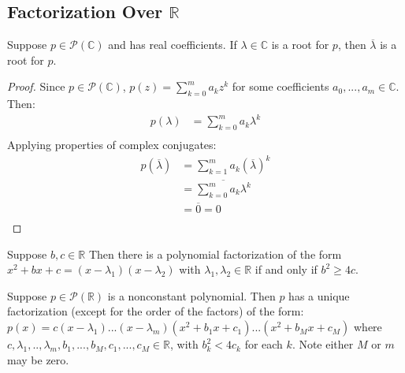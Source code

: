 \documentclass{article}
\begin{document}
\subsection{Factorization Over $\mathbb{R}$}

\begin{theorem}
  \label{thm:polynomial-with-reall-coefficients-have-complex-conjugate-zeros}
  Suppose $p \in \mathcal{P}(\mathbb{C})$ and has real
  coefficients. If $\lambda \in \mathbb{C}$ is a root for $p$, then
  $\overline{\lambda}$ is a root for $p$.
\end{theorem}
\begin{proof}
  Since $p \in \mathcal{P}(\mathbb{C})$, $p(z) = \sum_{k=0}^m a_k z^k$
  for some coefficients $a_0, ..., a_m \in \mathbb{C}$. Then:
  \begin{align*}
    p(\lambda) &= \sum_{k=0}^m a_k \lambda^k \\
  \end{align*}
  Applying properties of complex conjugates:
  \begin{align*}
    p(\overline{\lambda}) &= \sum_{k=1}^m a_k (\overline{\lambda})^k \\
                          &= \overline{\sum_{k=0}^m a_k \lambda^k} \\
                          &= \overline{0} = 0 \\
  \end{align*}
\end{proof}

\begin{theorem}
  \label{thm:factorization-of-quadratic-polynomial}
  Suppose $b,c \in \mathbb{R}$ Then there is a polynomial
  factorization of the form $x^2 + bx + c = (x - \lambda_1)(x -
  \lambda_2)$ with $\lambda_1, \lambda_2 \in \mathbb{R}$ if and only
  if $b^2 \ge 4c$.
\end{theorem}

\begin{theorem}
  \label{thm:factorization-of-polynomial-in-R}
  Suppose $p \in \mathcal{P}(\mathbb{R})$ is a nonconstant
  polynomial. Then $p$ has a unique factorization (except for the
  order of the factors) of the form:
  $p(x) = c(x-\lambda_1)...(x-\lambda_m)(x^2 + b_1x + c_1)...(x^2 +
  b_Mx + c_M)$
  where $c,\lambda_1,..,\lambda_m,b_1,...,b_M,c_1,...,c_M \in
  \mathbb{R}$, with $b_k^2 < 4c_k$ for each $k$. Note either $M$ or
  $m$ may be zero.
\end{theorem}
\end{document}
